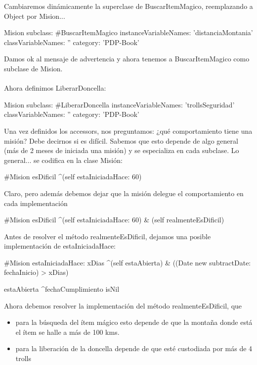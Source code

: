 \documentclass[a4paper,12pt]{book}
\begin{document}
Cambiaremos dinámicamente la superclase de BuscarItemMagico, reemplazando a Object por Mision...

\begin{code}
Mision subclass: #BuscarItemMagico
	instanceVariableNames: 'distanciaMontania'
	classVariableNames: ''
	category: 'PDP-Book'
\end{code}

Damos ok al mensaje de advertencia y ahora tenemos a BuscarItemMagico como subclase de Mision.
\\
\\
Ahora definimos LiberarDoncella:

\begin{code}
Mision subclass: #LiberarDoncella
	instanceVariableNames: 'trollsSeguridad'
	classVariableNames: ''
	category: 'PDP-Book'
\end{code}

\vspace{\baselineskip}
Una vez definidos los accessors, nos preguntamos: ¿qué comportamiento tiene una misión? Debe decirnos
si es difícil. Sabemos que esto depende de algo general (más de 2 meses de iniciada una misión) y se
especializa en cada subclase. Lo general... se codifica en la clase Misión:

\begin{code}
#Mision
esDificil
	^(self estaIniciadaHace: 60)
\end{code}

Claro, pero además debemos dejar que la misión delegue el comportamiento en cada implementación

\begin{code}
#Mision
esDificil
	^(self estaIniciadaHace: 60) & (self realmenteEsDificil)
\end{code}

Antes de resolver el método realmenteEsDificil, dejamos una posible implementación de estaIniciadaHace:

\begin{code}
#Mision
estaIniciadaHace: xDias
      ^(self estaAbierta) & ((Date new subtractDate: fechaInicio) > xDias)
      
estaAbierta
      ^fechaCumplimiento isNil       
\end{code}

\vspace{\baselineskip}
Ahora debemos resolver la implementación del método realmenteEsDificil, que
\begin{itemize}
 \item para la búsqueda del ítem mágico esto depende de que la montaña donde está el ítem se halle a más 
 de 100 kms.
 \item para la liberación de la doncella depende de que esté custodiada por más de 4 trolls
\end{itemize}
\end{document}

